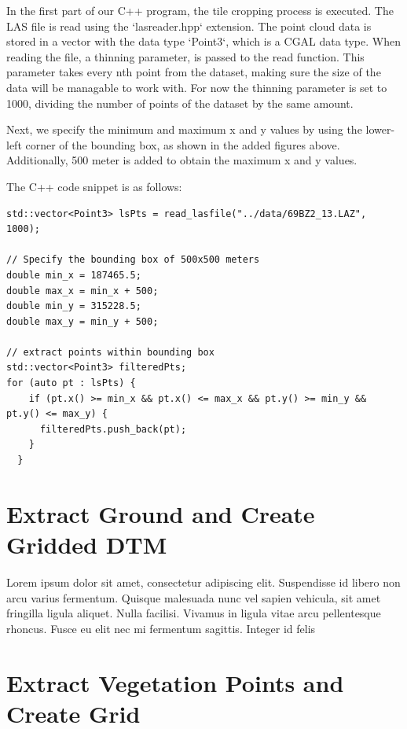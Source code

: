 \documentclass{article}
\begin{document}
In the first part of our C++ program, the tile cropping process is executed. The LAS file is read using the `lasreader.hpp` extension. The point cloud data is stored in a vector with the data type `Point3`, which is a CGAL data type. When reading the file, a thinning parameter, is passed to the read function. This parameter takes every nth point from the dataset, making sure the size of the data will be managable to work with. For now the thinning parameter is set to 1000, dividing the number of points of the dataset by the same amount.

Next, we specify the minimum and maximum x and y values by using the lower-left corner of the bounding box, as shown in the added figures above. Additionally, 500 meter is added to obtain the maximum x and y values.

\newpage

The C++ code snippet is as follows:

\begin{lstlisting}[style=cppstyle, caption={Specifying bounding box}, label={yourlabel}]
std::vector<Point3> lsPts = read_lasfile("../data/69BZ2_13.LAZ", 1000);

// Specify the bounding box of 500x500 meters
double min_x = 187465.5;
double max_x = min_x + 500;
double min_y = 315228.5;
double max_y = min_y + 500;

// extract points within bounding box
std::vector<Point3> filteredPts;
for (auto pt : lsPts) {
    if (pt.x() >= min_x && pt.x() <= max_x && pt.y() >= min_y && pt.y() <= max_y) {
      filteredPts.push_back(pt);
    }
  }
\end{lstlisting}

\section{Extract Ground and Create Gridded DTM}

Lorem ipsum dolor sit amet, consectetur adipiscing elit. Suspendisse id libero non arcu varius fermentum. Quisque malesuada nunc vel sapien vehicula, sit amet fringilla ligula aliquet. Nulla facilisi. Vivamus in ligula vitae arcu pellentesque rhoncus. Fusce eu elit nec mi fermentum sagittis. Integer id felis
\newpage

\section{Extract Vegetation Points and Create Grid}
\end{document}
